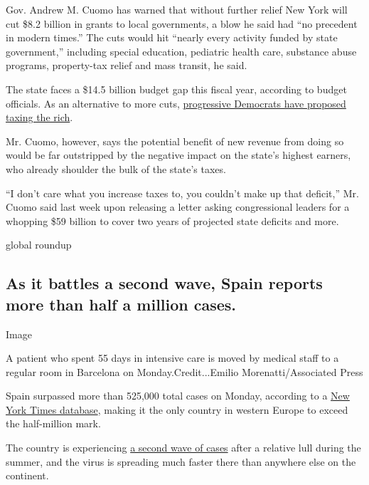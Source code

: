 Gov. Andrew M. Cuomo has warned that without further relief New York
will cut \$8.2 billion in grants to local governments, a blow he said
had ``no precedent in modern times.'' The cuts would hit ``nearly every
activity funded by state government,'' including special education,
pediatric health care, substance abuse programs, property-tax relief and
mass transit, he said.

The state faces a \$14.5 billion budget gap this fiscal year, according
to budget officials. As an alternative to more cuts,
\href{https://www.nytimes3xbfgragh.onion/2020/09/07/nyregion/wealth-tax-budget-billionaires.html}{progressive
Democrats have proposed taxing the rich}.

Mr. Cuomo, however, says the potential benefit of new revenue from doing
so would be far outstripped by the negative impact on the state's
highest earners, who already shoulder the bulk of the state's taxes.

``I don't care what you increase taxes to, you couldn't make up that
deficit,'' Mr. Cuomo said last week upon releasing a letter asking
congressional leaders for a whopping \$59 billion to cover two years of
projected state deficits and more.

global roundup

\hypertarget{as-it-battles-a-second-wave-spain-reports-more-than-half-a-million-cases}{%
\subsection{As it battles a second wave, Spain reports more than half a
million
cases.}\label{as-it-battles-a-second-wave-spain-reports-more-than-half-a-million-cases}}

Image

A patient who spent 55 days in intensive care is moved by medical staff
to a regular room in Barcelona on Monday.Credit...Emilio
Morenatti/Associated Press

Spain surpassed more than 525,000 total cases on Monday, according to a
\href{https://www.nytimes3xbfgragh.onion/interactive/2020/world/europe/spain-coronavirus-cases.html}{New
York Times database}, making it the only country in western Europe to
exceed the half-million mark.

The country is experiencing
\href{https://www.nytimes3xbfgragh.onion/2020/08/31/world/europe/coronavirus-covid-spain-second-wave.html}{a
second wave of cases} after a relative lull during the summer, and the
virus is spreading much faster there than anywhere else on the
continent.

